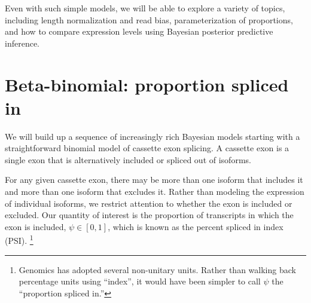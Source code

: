 \documentclass[11pt]{report}
\begin{document}
Even with such simple models, we will be able to explore a variety of
topics, including length normalization and read bias, parameterization
of proportions, and how to compare expression levels using Bayesian
posterior predictive inference.


\section{Beta-binomial: proportion spliced in}

We will build up a sequence of increasingly rich Bayesian models
starting with a straightforward binomial model of cassette exon
splicing. A cassette exon is a single exon that is alternatively
included or spliced out of isoforms.

For any given cassette exon, there may be more than one isoform that
includes it and more than one isoform that excludes it. Rather than
modeling the expression of individual isoforms, we restrict attention
to whether the exon is included or excluded. Our quantity of interest
is the proportion of transcripts in which the exon is included,
$\psi \in [0, 1]$, which is known as the percent spliced in index
(PSI).%
\footnote{Genomics has adopted several non-unitary units.
  Rather than walking back percentage units using ``index'', it would
  have been simpler to call $\psi$ the ``proportion spliced in.''}
\end{document}
